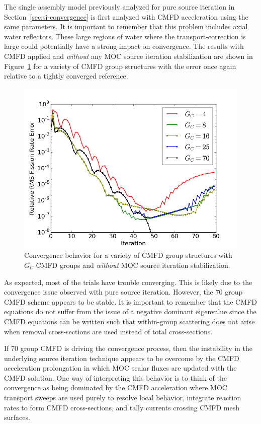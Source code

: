 The single assembly model previously analyzed for pure source iteration in Section~\ref{sec:si-convergence} is first analyzed with \ac{CMFD} acceleration using the same parameters. It is important to remember that this problem includes axial water reflectors. These large regions of water where the transport-correction is large could potentially have a strong impact on convergence. The results with \ac{CMFD} applied and \textit{without} any \ac{MOC} source iteration stabilization are shown in Figure~\ref{fig:sa-cmfd-no-stab} for a variety of \ac{CMFD} group structures with the error once again relative to a tightly converged reference.
\begin{figure}[ht!]
	\centering
	\includegraphics[width=0.71\linewidth]{figures/convergence/sa_no_stab_cmfd.png}
	\caption{Convergence behavior for a variety of \ac{CMFD} group structures with $G_C$ \ac{CMFD} groups and \textit{without} \ac{MOC} source iteration stabilization.}
	\label{fig:sa-cmfd-no-stab}
\end{figure}
As expected, most of the trials have trouble converging. This is likely due to the convergence issue observed with pure source iteration. However, the 70 group \ac{CMFD} scheme appears to be stable. It is important to remember that the \ac{CMFD} equations do not suffer from the issue of a negative dominant eigenvalue since the \ac{CMFD} equations can be written such that within-group scattering does not arise when removal cross-sections are used instead of total cross-sections.

If 70 group \ac{CMFD} is driving the convergence process, then the instability in the underlying source iteration technique appears to be overcome by the \ac{CMFD} acceleration prolongation in which \ac{MOC} scalar fluxes are updated with the \ac{CMFD} solution. One way of interpreting this behavior is to think of the convergence as being dominated by the \ac{CMFD} acceleration where \ac{MOC} transport sweeps are used purely to resolve local behavior, integrate reaction rates to form \ac{CMFD} cross-sections, and tally currents crossing \ac{CMFD} mesh surfaces. 

